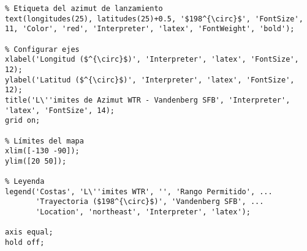 \begin{verbatim}
% Etiqueta del azimut de lanzamiento
text(longitudes(25), latitudes(25)+0.5, '$198^{\circ}$', 'FontSize', 11, 'Color', 'red', 'Interpreter', 'latex', 'FontWeight', 'bold');

% Configurar ejes
xlabel('Longitud ($^{\circ}$)', 'Interpreter', 'latex', 'FontSize', 12);
ylabel('Latitud ($^{\circ}$)', 'Interpreter', 'latex', 'FontSize', 12);
title('L\''imites de Azimut WTR - Vandenberg SFB', 'Interpreter', 'latex', 'FontSize', 14);
grid on;

% Límites del mapa
xlim([-130 -90]);
ylim([20 50]);

% Leyenda
legend('Costas', 'L\''imites WTR', '', 'Rango Permitido', ...
       'Trayectoria ($198^{\circ}$)', 'Vandenberg SFB', ...
       'Location', 'northeast', 'Interpreter', 'latex');

axis equal;
hold off;



\end{verbatim}